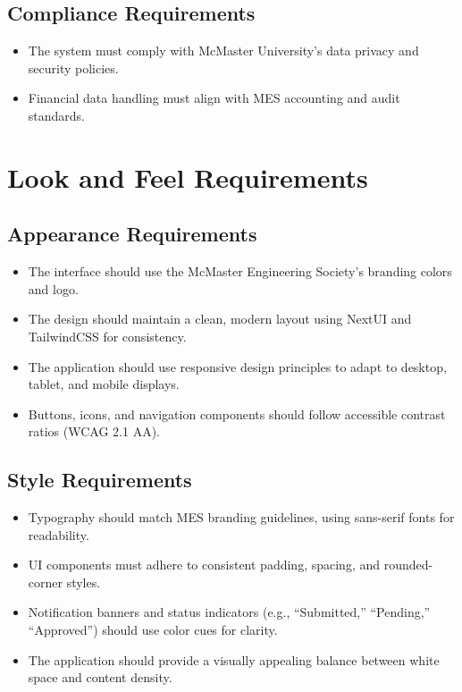 \documentclass[12pt]{article}
\begin{document}
    \subsection{Compliance Requirements}
    \begin{itemize}
        \item The system must comply with McMaster University’s data privacy and security policies.
        \item Financial data handling must align with MES accounting and audit standards.
    \end{itemize}

\section{Look and Feel Requirements}
    \subsection{Appearance Requirements}
    \begin{itemize}
        \item The interface should use the McMaster Engineering Society’s branding colors and logo.
        \item The design should maintain a clean, modern layout using NextUI and TailwindCSS for consistency.
        \item The application should use responsive design principles to adapt to desktop, tablet, and mobile displays.
        \item Buttons, icons, and navigation components should follow accessible contrast ratios (WCAG 2.1 AA).
    \end{itemize}

    \subsection{Style Requirements}
    \begin{itemize}
        \item Typography should match MES branding guidelines, using sans-serif fonts for readability.
        \item UI components must adhere to consistent padding, spacing, and rounded-corner styles.
        \item Notification banners and status indicators (e.g., “Submitted,” “Pending,” “Approved”) should use color cues for clarity.
        \item The application should provide a visually appealing balance between white space and content density.
    \end{itemize}
\end{document}
